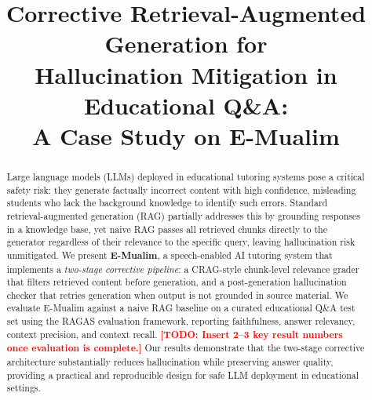 \documentclass[conference]{IEEEtran}
\newcommand{\todo}[1]{\textcolor{red}{\textbf{[TODO: #1]}}}
\begin{document}
\title{Corrective Retrieval-Augmented Generation for\\
Hallucination Mitigation in Educational Q\&A:\\
A Case Study on E-Mualim}

\author{
  \and
  \and
}

\maketitle

\begin{abstract}
Large language models (LLMs) deployed in educational tutoring systems
pose a critical safety risk: they generate factually incorrect content
with high confidence, misleading students who lack the background
knowledge to identify such errors.
Standard retrieval-augmented generation (RAG) partially addresses this
by grounding responses in a knowledge base, yet naive RAG passes all
retrieved chunks directly to the generator regardless of their
relevance to the specific query, leaving hallucination risk unmitigated.
We present \textbf{E-Mualim}, a speech-enabled AI tutoring system
that implements a \emph{two-stage corrective pipeline}: a CRAG-style
chunk-level relevance grader that filters retrieved content before
generation, and a post-generation hallucination checker that retries
generation when output is not grounded in source material.
We evaluate E-Mualim against a naive RAG baseline on a curated
educational Q\&A test set using the RAGAS evaluation framework,
reporting faithfulness, answer relevancy, context precision, and
context recall.
\todo{Insert 2--3 key result numbers once evaluation is complete.}
Our results demonstrate that the two-stage corrective architecture
substantially reduces hallucination while preserving answer quality,
providing a practical and reproducible design for safe LLM deployment
in educational settings.
\end{abstract}
\end{document}
